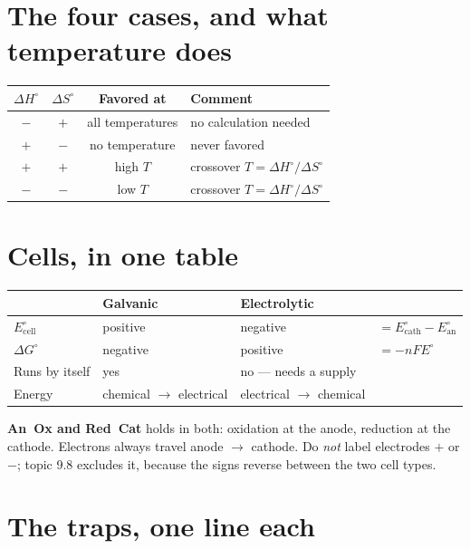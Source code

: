 \documentclass{apchem-worksheet}
\begin{document}
\section*{\sffamily The four cases, and what temperature does}

\begin{center}
\renewcommand{\arraystretch}{1.15}
\begin{tabular}{@{}cccl@{}}
\toprule
$\Delta H^\circ$ & $\Delta S^\circ$ & \textbf{Favored at} &
  \textbf{Comment}\\
\midrule
$-$ & $+$ & all temperatures & no calculation needed \\
$+$ & $-$ & no temperature & never favored \\
$+$ & $+$ & high $T$ & crossover $T = \Delta H^\circ/\Delta S^\circ$ \\
$-$ & $-$ & low $T$ & crossover $T = \Delta H^\circ/\Delta S^\circ$ \\
\bottomrule
\end{tabular}
\end{center}

\section*{\sffamily Cells, in one table}

\begin{center}
\renewcommand{\arraystretch}{1.15}
\begin{tabular}{@{}llll@{}}
\toprule
 & \textbf{Galvanic} & \textbf{Electrolytic} & \\
\midrule
$E^\circ_{\text{cell}}$ & positive & negative & $= E^\circ_{\text{cath}}
  - E^\circ_{\text{an}}$ \\
$\Delta G^\circ$ & negative & positive & $= -nFE^\circ$ \\
Runs by itself & yes & no --- needs a supply & \\
Energy & chemical $\to$ electrical & electrical $\to$ chemical & \\
\bottomrule
\end{tabular}
\end{center}

\textbf{An~Ox and Red~Cat} holds in both: oxidation at the anode, reduction
at the cathode. Electrons always travel anode $\to$ cathode. Do
\emph{not} label electrodes $+$ or $-$; topic 9.8 excludes it, because the
signs reverse between the two cell types.

\section*{\sffamily The traps, one line each}
\end{document}
